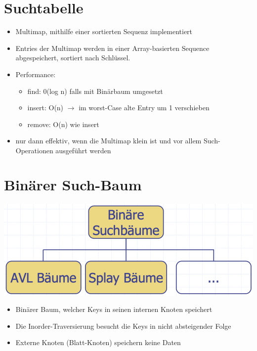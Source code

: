 \section{Suchtabelle}
\begin{itemize}
    \item Multimap, mithilfe einer sortierten Sequenz implementiert
    \item Entries der Multimap werden in einer Array-basierten Sequence abgespeichert, sortiert nach Schlüssel.
    \item Performance:
    \begin{itemize}
        \item find: 0(log n) falls mit Binärbaum umgesetzt
        \item insert: O(n) $\rightarrow$ im worst-Case alte Entry um 1 verschieben
        \item remove: O(n) wie insert
    \end{itemize}
    \item nur dann effektiv, wenn die Multimap klein ist und vor allem Such-Operationen ausgeführt werden
\end{itemize}


\section{Binärer Such-Baum}
\begin{center}
    \includegraphics[scale=.15]{graphic/01 BinarySearchTrees/Ubersicht.png}
    \vspace{-4pt}
\end{center}
\begin{itemize}
    \item Binärer Baum, welcher Keys in seinen internen Knoten speichert
    \item Die Inorder-Traversierung besucht die Keys in nicht absteigender Folge
    \item Externe Knoten (Blatt-Knoten) speichern keine Daten
\end{itemize}

